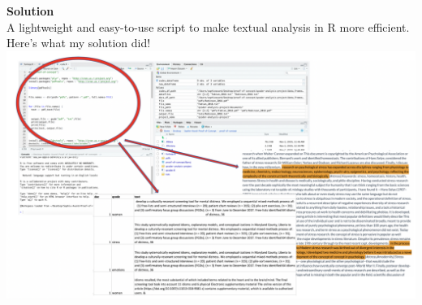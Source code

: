 \documentclass[unknownkeysallowed,usepdftitle=false, parskip=full]{beamer}
\newcommand{\secvariable}{nothing}
\newcommand{\mysection}[1]{\renewcommand{\secvariable}{#1}
}
\begin{document}
\begin{frame}\label{\secvariable} %
\begin{center}
\textbf{Solution}\\
A lightweight and easy-to-use script to make textual analysis in R more efficient. Here's what my solution did!
\includegraphics[width=1\textwidth,height=0.8\textheight,keepaspectratio]{figure6.png}
\end{center}

    \parbox{\linewidth}{

}
\end{frame}
\mysection{radar}
\end{document}
